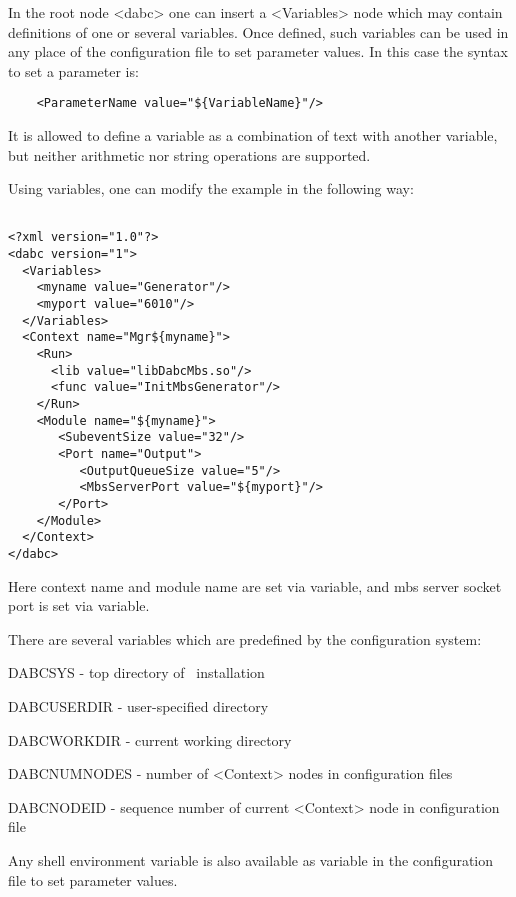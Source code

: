 In the root node <dabc> one can insert a <Variables> node which may contain 
definitions of one or several variables. Once defined, 
such variables can be used in any place of the configuration file to set parameter values.
In this case the syntax to set a parameter is:

\begin{small}
\begin{verbatim}
    <ParameterName value="${VariableName}"/>
\end{verbatim}
\end{small}

It is allowed to define a variable as a combination of text with another variable, 
but neither arithmetic nor string operations are supported. 

Using variables, one can modify the example in the following way:

\begin{small}
\begin{verbatim}

<?xml version="1.0"?>
<dabc version="1">
  <Variables>
    <myname value="Generator"/> 
    <myport value="6010"/> 
  </Variables>
  <Context name="Mgr${myname}">
    <Run>
      <lib value="libDabcMbs.so"/>
      <func value="InitMbsGenerator"/>
    </Run>
    <Module name="${myname}">
       <SubeventSize value="32"/>
       <Port name="Output">
          <OutputQueueSize value="5"/>
          <MbsServerPort value="${myport}"/>
       </Port>
    </Module>
  </Context>
</dabc>
\end{verbatim}
\end{small}

Here context name and module name are set via  variable,
and mbs server socket port is set via  variable.

There are several variables which are predefined by the configuration system:

\bbul
\item DABCSYS - top directory of \dabc\ installation
\item DABCUSERDIR - user-specified directory
\item DABCWORKDIR - current working directory
\item DABCNUMNODES - number of <Context> nodes in configuration files
\item DABCNODEID - sequence number of current <Context> node in configuration file 
\ebul

Any shell environment variable 
is also available as variable in the configuration file to set parameter values. 

